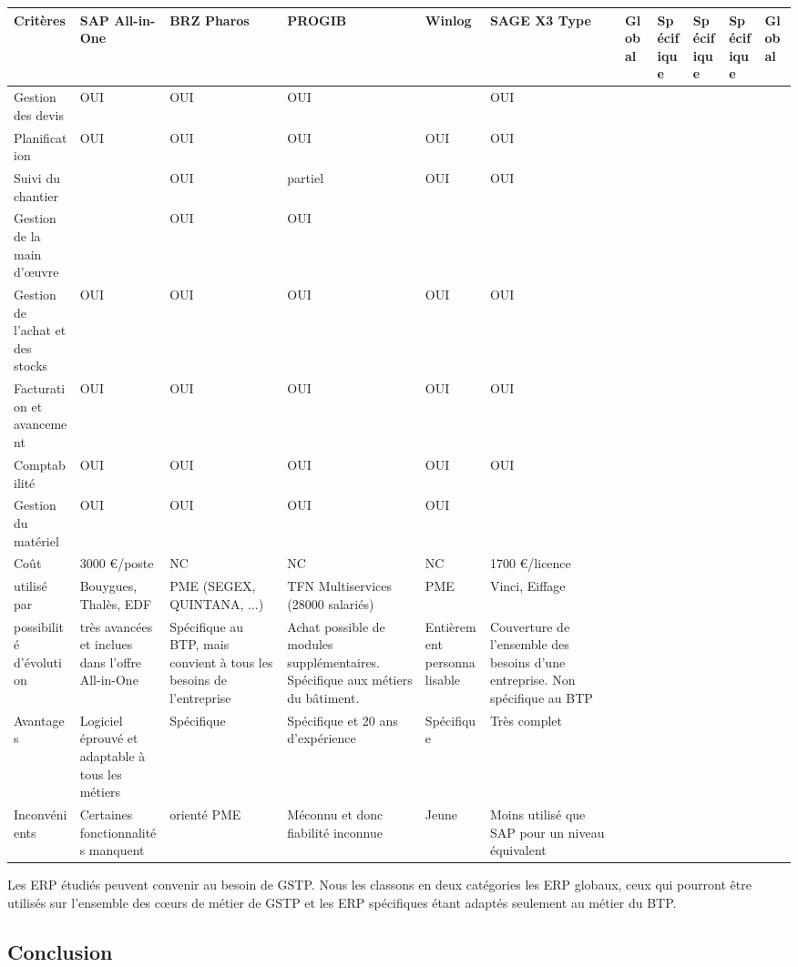 \documentclass[twoside]{article}
\begin{document}
\hskip -15mm
\begin{longtable}{|m{2cm}|m{25mm}|m{25mm}|m{25mm}|m{25mm}|m{25mm}|}
\hline
Critères&SAP All-in-One&BRZ Pharos&PROGIB&Winlog&SAGE X3\endhead
\hline
Type&Global&Spécifique&Spécifique&Spécifique&Global\\
\hline
Gestion des devis&OUI&OUI&OUI&&OUI\\
\hline
Planification &OUI&OUI&OUI&OUI&OUI\\
\hline
Suivi du chantier&&OUI&partiel&OUI&OUI\\
\hline
Gestion de la main d’œuvre&&OUI&OUI&&\\
\hline
Gestion de l’achat et des stocks&OUI&OUI&OUI&OUI&OUI\\
\hline
Facturation et avancement&OUI&OUI&OUI&OUI&OUI\\
\hline
Comptabilité&OUI&OUI&OUI&OUI&OUI\\
\hline
Gestion du matériel&OUI&OUI&OUI&OUI&\\
\hline
Coût&3000 \euro/poste&NC&NC&NC&1700 \euro/licence\\
\hline
utilisé par&Bouygues, Thalès, EDF&PME (SEGEX, QUINTANA, ...)
&TFN Multiservices (28000 salariés)&PME&Vinci, Eiffage\\
\hline
possibilité d'évolution&très avancées et inclues dans l'offre All-in-One
&Spécifique au BTP, mais convient à tous les besoins de l'entreprise
&Achat possible de modules supplémentaires.
Spécifique aux métiers du bâtiment.
&Entièrement personnalisable&Couverture de l'ensemble des besoins
d'une entreprise. Non spécifique au BTP\\
\hline
Avantages&Logiciel éprouvé et adaptable à tous les métiers&Spécifique
&Spécifique et 20 ans d'expérience&Spécifique&Très complet\\
\hline
Inconvénients&Certaines fonctionnalités manquent&orienté PME
&Méconnu et donc fiabilité inconnue&Jeune
&Moins utilisé que SAP pour un niveau équivalent
\\\hline
\end{longtable}
\vskip 10pt

Les ERP étudiés peuvent convenir au besoin de GSTP. Nous les classons en deux
catégories les ERP globaux, ceux qui pourront être utilisés sur l'ensemble des cœurs
de métier de GSTP et les ERP spécifiques étant adaptés seulement au métier du BTP.

\vfill
\pagebreak


\subsection{Conclusion}
\end{document}
